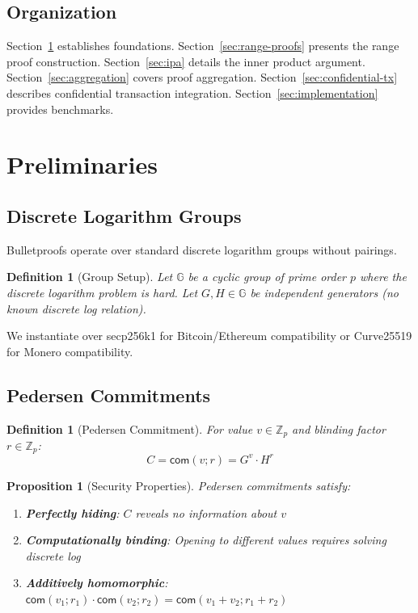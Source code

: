 \documentclass[11pt,a4paper]{article}
\newtheorem{definition}[theorem]{Definition}
\newtheorem{proposition}[theorem]{Proposition}
\newcommand{\G}{\mathbb{G}}
\newcommand{\Z}{\mathbb{Z}}
\newcommand{\com}{\mathsf{com}}
\begin{document}
\subsection{Organization}

Section~\ref{sec:preliminaries} establishes foundations. Section~\ref{sec:range-proofs} presents the range proof construction. Section~\ref{sec:ipa} details the inner product argument. Section~\ref{sec:aggregation} covers proof aggregation. Section~\ref{sec:confidential-tx} describes confidential transaction integration. Section~\ref{sec:implementation} provides benchmarks.

\section{Preliminaries}
\label{sec:preliminaries}

\subsection{Discrete Logarithm Groups}

Bulletproofs operate over standard discrete logarithm groups without pairings.

\begin{definition}[Group Setup]
Let $\G$ be a cyclic group of prime order $p$ where the discrete logarithm problem is hard. Let $G, H \in \G$ be independent generators (no known discrete log relation).
\end{definition}

We instantiate over secp256k1 for Bitcoin/Ethereum compatibility or Curve25519 for Monero compatibility.

\subsection{Pedersen Commitments}

\begin{definition}[Pedersen Commitment]
For value $v \in \Z_p$ and blinding factor $r \in \Z_p$:
\[
C = \com(v; r) = G^v \cdot H^r
\]
\end{definition}

\begin{proposition}[Security Properties]
Pedersen commitments satisfy:
\begin{enumerate}[label=(\roman*)]
    \item \textbf{Perfectly hiding}: $C$ reveals no information about $v$
    \item \textbf{Computationally binding}: Opening to different values requires solving discrete log
    \item \textbf{Additively homomorphic}: $\com(v_1; r_1) \cdot \com(v_2; r_2) = \com(v_1 + v_2; r_1 + r_2)$
\end{enumerate}
\end{proposition}
\end{document}
